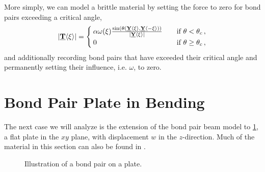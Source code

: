 More simply, we can model a brittle material by setting the force to zero for bond pairs exceeding a critical angle,
%
\begin{equation}
|\vstate{T}{}{\xi}| = 
  \begin{cases}
    \alpha \omega(\xi) \frac{\sin(\theta(\vstate{Y}{}{\xi},\vstate{Y}{}{\mathbf{-\xi}}))}{|\vstate{Y}{}{\xi}|} & \quad \text{if } \theta < \theta_c\,,\\
    0 & \quad \text{if } \theta \geq \theta_c\,,
  \end{cases}
  \label{eq:brittle_force}
\end{equation}
%
and additionally recording bond pairs that have exceeded their critical angle and permanently setting their influence, i.e. $\omega$, to zero.
%
%
\section{Bond Pair Plate in Bending}
The next case we will analyze is the extension of the bond pair beam model to \cref{fig:BondPairPlate}, a flat plate in the \(xy\) plane, with displacement $w$ in the \(z\)-direction. 
Much of the material in this section can also be found in \cite{ogrady2014plates}.
%
\begin{figure}[htbp]
    \centering
    \caption{Illustration of a bond pair on a plate.}
    \label{fig:BondPairPlate}
\end{figure}
%


